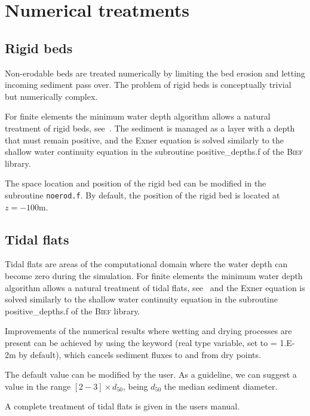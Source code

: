 \section{Numerical treatments}
\subsection{Rigid beds}
Non-erodable beds are treated numerically by limiting the bed erosion and letting incoming sediment pass over. The problem of rigid beds is conceptually trivial but numerically complex. 

For finite elements the minimum water depth algorithm allows a natural treatment of rigid
beds, see~\cite{Hervouet11}. The sediment is managed as a layer with a
depth that must remain positive, and the Exner equation is solved similarly to the shallow water continuity equation in the subroutine {\ttfamily positive\_depths.f} of the \textsc{Bief} library.

The space location and position of the rigid bed can be modified in the subroutine \texttt{noerod.f}. By default, the position of the rigid bed is located at $z=-100$m.

\subsection{Tidal flats}
Tidal flats are areas of the computational domain where the water depth can become zero during the simulation. For finite elements the minimum water depth algorithm allows a natural treatment of tidal flats, see~\cite{Hervouet11} and the Exner equation is solved similarly to the shallow water continuity equation in the subroutine {\ttfamily positive\_depths.f} of the \textsc{Bief} library.

Improvements of the numerical results where wetting and drying processes are present can be achieved by using the keyword  (real type variable, set to {\ttfamily = 1.E-2}m by default), which cancels sediment fluxes to and from dry points.  

The default value can be modified by the user. As a guideline, we can suggest a value in the range $[2-3]\times d_{50}$, being $d_{50}$ the median sediment diameter.

A complete treatment of tidal flats is given in the  users manual.


